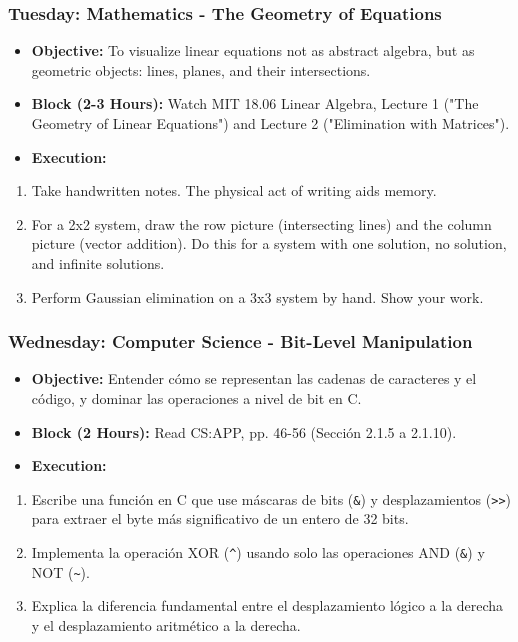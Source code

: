 \subsubsection{\textbf{Tuesday: Mathematics - The Geometry of Equations}}
\begin{itemize}
  \item \textbf{Objective:} To visualize linear equations not as abstract algebra, but as geometric objects: lines, planes, and their intersections.
  \item \textbf{Block (2-3 Hours):} Watch MIT 18.06 Linear Algebra, Lecture 1 ("The Geometry of Linear Equations") and Lecture 2 ("Elimination with Matrices").
  \item \textbf{Execution:}
\end{itemize}
\begin{enumerate}
  \item Take handwritten notes. The physical act of writing aids memory.
  \item For a 2x2 system, draw the row picture (intersecting lines) and the column picture (vector addition). Do this for a system with one solution, no solution, and infinite solutions.
  \item Perform Gaussian elimination on a 3x3 system by hand. Show your work.

\end{enumerate}
\subsubsection{\textbf{Wednesday: Computer Science - Bit-Level Manipulation}}
\begin{itemize}
  \item \textbf{Objective:} Entender cómo se representan las cadenas de caracteres y el código, y dominar las operaciones a nivel de bit en C.
  \item \textbf{Block (2 Hours):} Read CS:APP, pp. 46-56 (Sección 2.1.5 a 2.1.10).
  \item \textbf{Execution:}
\end{itemize}
\begin{enumerate}
  \item Escribe una función en C que use máscaras de bits (\texttt{\&}) y desplazamientos (\texttt{\textgreater{}\textgreater{}}) para extraer el byte más significativo de un entero de 32 bits.
  \item Implementa la operación XOR (\texttt{\textasciicircum{}}) usando solo las operaciones AND (\texttt{\&}) y NOT (\texttt{\textasciitilde{}}).
  \item Explica la diferencia fundamental entre el desplazamiento lógico a la derecha y el desplazamiento aritmético a la derecha.

\end{enumerate}
